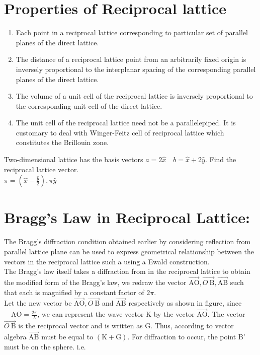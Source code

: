 \section{Properties of Reciprocal lattice}
\begin{enumerate}
	\item Each point in a reciprocal lattice corresponding to particular set of parallel planes of the direct lattice.
	\item The distance of a reciprocal lattice point from an arbitrarily fixed origin is inversely proportional to the interplanar spacing of the corresponding parallel planes of the direct lattice.
	\item The volume of a unit cell of the reciprocal lattice is inversely proportional to the corresponding unit cell of the direct lattice.
	\item The unit cell of the reciprocal lattice need not be a parallelepiped. It is customary to deal with Winger-Feitz cell of reciprocal lattice which constitutes the Brillouin zone.
\end{enumerate}
\begin{example}
	 Two-dimensional lattice has the basis vectors $a=2 \hat{x} \quad b=\hat{x}+2 \hat{y}$. Find the reciprocal lattice vector.\\
	 $\pi=\left(\hat{x}-\frac{\hat{y}}{2}\right), \pi \hat{y}$
\end{example}

\section{Bragg's Law in Reciprocal Lattice:}
The Bragg's diffraction condition obtained earlier by considering reflection from parallel lattice plane can be used to express geometrical relationship between the vectors in the reciprocal lattice such a using a Ewald construction.\\
The Bragg's law itself takes a diffraction from in the reciprocal lattice to obtain the modified form of the Bragg's law, we redraw the vector $\overrightarrow{\mathrm{AO}}, \overrightarrow{O \mathrm{~B}}, \overrightarrow{\mathrm{AB}}$ such that each is magnified by a constant factor of $2 \pi$. \\
Let the new vector be $\overrightarrow{\mathrm{AO}}, \overrightarrow{O \mathrm{~B}}$ and $\overrightarrow{\mathrm{AB}}$ respectively as shown in figure, since $\quad \mathrm{AO}=\frac{2 \pi}{\lambda}$, we can represent the wave vector $\mathrm{K}$ by the vector $\overrightarrow{\mathrm{AO}}$. The vector $\overrightarrow{O \mathrm{~B}}$ is the reciprocal vector and is written as $\mathrm{G}$. Thus, according to vector algebra $\overrightarrow{\mathrm{AB}}$ must be equal to $(\mathrm{K}+\mathrm{G})$. For diffraction to occur, the point B' must be on the sphere. i.e.


